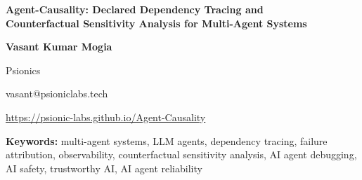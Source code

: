 \documentclass[11pt]{article}
\begin{document}
\begin{center}
{\LARGE\bfseries Agent-Causality: Declared Dependency Tracing and\\[2pt]
Counterfactual Sensitivity Analysis for Multi-Agent Systems\par}
\vspace{1.4em}
{\large\bfseries Vasant Kumar Mogia\par}
\vspace{0.3em}
{\large Psionics\par}
\vspace{0.4em}
{\large{vasant@psioniclabs.tech}\par}
\vspace{0.3em}
{\href{https://psionic-labs.github.io/Agent-Causality/}{\textcolor{blue!80!black}{https://psionic-labs.github.io/Agent-Causality}}\par}
\vspace{0.5em}
\end{center}
\vspace{1em}

\begin{abstract}
AI systems built from several cooperating agents are easy to record but hard to debug. A conventional log shows what happened in order, but not which earlier events a failure structurally depends on. The problem is harder when agents run in parallel and their outputs merge into one decision, because a failure may depend on one branch, on several, or on their joint ancestry. We present Agent-Causality, an open-source tool that records a dependency graph with explicit parent links, computes structural slices and provenance grades, and supports decision contracts with deterministic counterfactual replay. From the graph, the tool trims a run to structural ancestors, traces values to their sources with exact or coarse labels, and tests whether recorded inputs, alone or jointly, change a registered merge decision in replay. It also produces a structured summary and keeps optional model-written text in a separate block. We describe the design, assumptions, and limits; the evidence is five deterministic fixtures, a synthetic shared-state test, an offline single-port replacement test, and a five-task live pilot that did not exercise the injected failures. We do not claim actual causation. We outline proposed combinations with agent frameworks, test runners, approval systems, and security gateways.
\end{abstract}

\noindent\textbf{Keywords:} multi-agent systems, LLM agents, dependency tracing, failure attribution, observability, counterfactual sensitivity analysis, AI agent debugging, AI safety, trustworthy AI, AI agent reliability
\end{document}
